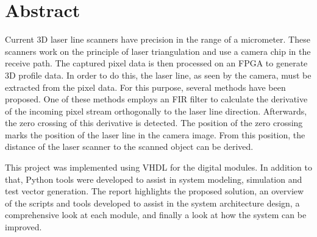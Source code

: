 \chapter{Abstract}\label{Abstract}

Current 3D laser line scanners have precision in the range of a micrometer. These scanners work on the principle of laser triangulation and use a camera chip in the receive path. The captured pixel data is then processed on an FPGA to generate 3D profile data. In order to do this, the laser line, as seen by the camera, must be extracted from the pixel data. For this purpose, several methods have been proposed. One of these methods employs an FIR filter to calculate the derivative of the incoming pixel stream orthogonally to the laser line direction. Afterwards, the zero crossing of this derivative is detected. The position of the zero crossing marks the position of the laser line in the camera image. From this position, the distance of the laser scanner to the scanned object can be derived.

This project was implemented using VHDL for the digital modules. In addition to that, Python tools were developed to assist in system modeling, simulation and test vector generation. The report highlights the proposed solution, an overview of the scripts and tools developed to assist in the system architecture design, a comprehensive look at each module, and finally a look at how the system can be improved.
